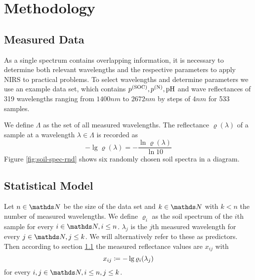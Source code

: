\section{Methodology}
\label{sec:methodology}
	
	\subsection{Measured Data}
	\label{ssec:measured-data}
	
		As a single spectrum contains overlapping information, it is necessary to determine both relevant wavelengths and the respective parameters to apply NIRS to practical problems.
		To select wavelengths and determine parameters we use an example data set, which contains $p^{\mathrm{(SOC)}},p^{\mathrm{(N)}},\mathrm{pH}$ and wave reflectances of 319 wavelengths ranging from $1400 \unit{nm}$ to $2672 \unit{nm}$ by steps of $4 \unit{nm}$ for 533 samples.%

		We define $\Lambda$ as the set of all measured wavelengths. The reflectance $\varrho(\lambda)$ of a sample at a wavelength $\lambda \in \Lambda$ is recorded as
		\[
			-\lg \varrho(\lambda) = -\frac{\ln \varrho(\lambda)}{\ln 10}
		\]
		Figure \ref{fig:soil-spec-rnd} shows six randomly chosen soil spectra in a diagram.
		\begin{figure*}
			\centering
			
			\caption{Six near infrared soil spectra of randomly chosen soil samples obtained from the data set, where $\lambda$ is the wavelength and $\rho(\lambda)$ the corresponding reflectance and each colour refers to one sample}
			\label{fig:soil-spec-rnd}
		\end{figure*}
		
	

	\subsection{Statistical Model}
	\label{ssec:statistical-model}
	
		Let $n\in\SN$ be the size of the data set and $k\in\SN$ with $k< n$ the number of measured wavelengths. We define
		$\varrho_i$ as the soil spectrum of the $i$th sample for every $i\in\SN,i\leq n$.
		$\lambda_j$ is the $j$th measured wavelength for every $j\in\SN,j\leq k$. We will alternatively refer to these as predictors.%
		Then according to section \ref{ssec:measured-data} the measured reflectance values are $x_{ij}$ with
		\[
			x_{ij} \coloneqq -\lg \varrho_i(\lambda_j)
		\]
		for every $i,j\in\SN,i\leq n,j\leq k$.
		
